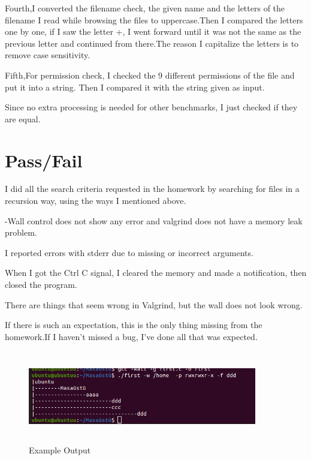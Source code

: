 \documentclass{article}
\begin{document}
Fourth,I converted the filename check, the given name and the letters of the filename I read while browsing the files to uppercase.Then I compared the letters one by one, if I saw the letter +, I went forward until it was not the same as the previous letter and continued from there.The reason I capitalize the letters is to remove case sensitivity.

Fifth,For permission check, I checked the 9 different permissions of the file and put it into a string. Then I compared it with the string given as input.

Since no extra processing is needed for other benchmarks, I just checked if they are equal.

\section{Pass/Fail}

I did all the search criteria requested in the homework by searching for files in a recursion way, using the ways I mentioned above.

-Wall control does not show any error and  valgrind does not have a memory leak problem.

I reported errors with stderr due to missing or incorrect arguments.

When I got the Ctrl C signal, I cleared the memory and made a notification, then closed the program.

There are things that seem wrong in Valgrind, but the wall does not look wrong.

If there is such an expectation, this is the only thing missing from the homework.If I haven't missed a bug, I've done all that was expected.
\begin{figure}[b]
\includegraphics[width=10cm,height=4cm]{ss.png}
\caption{Example Output}
\end{figure}
\end{document}
